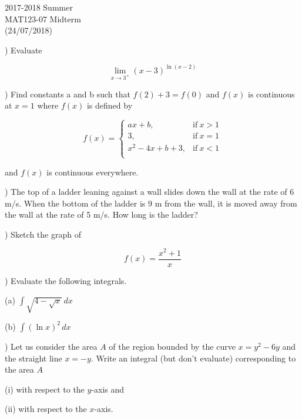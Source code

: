 \documentclass{article}
\begin{document}
\pagestyle{empty}
\large

\begin{center}
2017-2018 Summer\\MAT123-07 Midterm\\(24/07/2018)
\end{center}

) Evaluate

\[\lim_{x\to3^+}(x-3)^{\ln(x-2)}\]

\hfill

) Find constants a and b such that $f(2) + 3 = f(0)$ and $f(x)$ is continuous at $x=1$ where $f(x)$ is defined by

\[
f(x) =
\begin{cases}
ax + b, & \text{if}\ x > 1 \\
3, & \text{if}\ x = 1 \\
x^2-4x+b+3, & \text{if}\ x < 1 \\
\end{cases}
\]

\noindent and $f(x)$ is continuous everywhere.

\hfill

) The top of a ladder leaning against a wall slides down the wall at the rate of 6 m/s. When the bottom of the ladder is 9 m from the wall, it is moved away from the wall at the rate of 5 m/s. How long is the ladder?

\hfill

) Sketch the graph of

\[f(x) = \frac{x^2+1}{x}\]

\hfill

) Evaluate the following integrals.

\hfill

\noindent (a) $\displaystyle \int\sqrt{4-\sqrt{x}}\, dx$

\hfill

\noindent (b) $\displaystyle \int(\ln x)^2\, dx$

\hfill

) Let us consider the area $A$ of the region bounded by the curve $x=y^2-6y$ and the straight line $x=-y$. Write an integral (but don't evaluate) corresponding to the area $A$

\hfill

\noindent (i) with respect to the $y$-axis and

\hfill

\noindent (ii) with respect to the $x$-axis.
\end{document}
